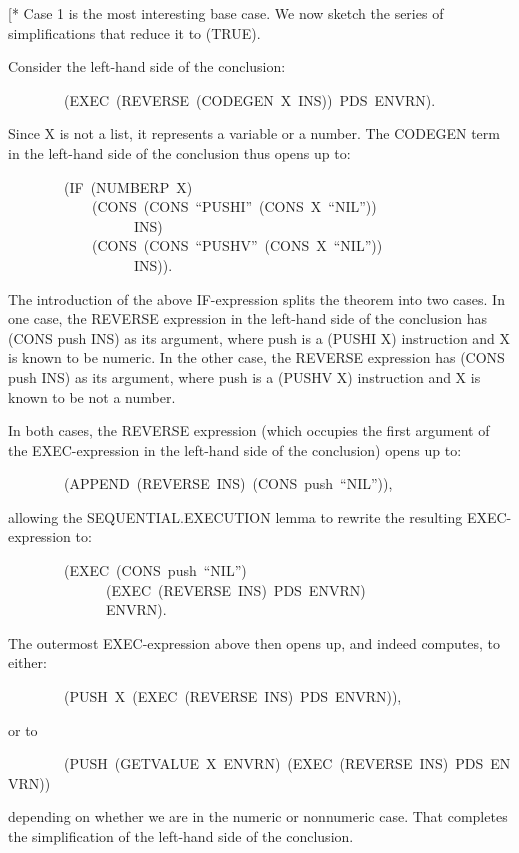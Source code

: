 \documentclass[11pt]{book}
\newenvironment{pubasis}{\begin{flushleft}\ttfamily\small}{\normalsize\rmfamily\end{flushleft}}
\begin{document}
[* Case 1 is the most interesting base case.  We  now sketch the
series of simplifications that reduce it to (TRUE).

Consider the left-hand side of the conclusion:
\begin{pubasis}
~~~~~~~~(EXEC~(REVERSE~(CODEGEN~X~INS))~PDS~ENVRN).\\
\end{pubasis}
Since X is not a list, it represents
a variable or a number.  The CODEGEN term in the left-hand side of the conclusion
thus opens up to:
\begin{pubasis}
~~~~~~~~(IF~(NUMBERP~X)\\
~~~~~~~~~~~~(CONS~(CONS~``PUSHI''~(CONS~X~``NIL''))\\
~~~~~~~~~~~~~~~~~~INS)\\
~~~~~~~~~~~~(CONS~(CONS~``PUSHV''~(CONS~X~``NIL''))\\
~~~~~~~~~~~~~~~~~~INS)).\\
\end{pubasis}
The introduction of the above IF-expression  splits the theorem into two cases.  In one case, the REVERSE
expression in the left-hand side of the conclusion
has (CONS push INS) as its argument, where push is a
(PUSHI X) instruction and X is known to be numeric.  In the other case,
the REVERSE expression has (CONS push INS) as its argument, where push
is a (PUSHV X) instruction and X is known to be not a number.

In both cases, the REVERSE expression (which occupies the first argument of the EXEC-expression
in the left-hand side of the conclusion) opens up
to:
\begin{pubasis}
~~~~~~~~(APPEND~(REVERSE~INS)~(CONS~push~``NIL'')),\\
\end{pubasis}
allowing the
SEQUENTIAL.EXECUTION lemma to rewrite the resulting EXEC-expression to:
\begin{pubasis}
~~~~~~~~(EXEC~(CONS~push~``NIL'')\\
~~~~~~~~~~~~~~(EXEC~(REVERSE~INS)~PDS~ENVRN)\\
~~~~~~~~~~~~~~ENVRN).\\
\end{pubasis}
The outermost EXEC-expression above then opens up, and indeed computes, to
either:
\begin{pubasis}
~~~~~~~~(PUSH~X~(EXEC~(REVERSE~INS)~PDS~ENVRN)),\\
\end{pubasis}
or to
\begin{pubasis}
~~~~~~~~(PUSH~(GETVALUE~X~ENVRN)~(EXEC~(REVERSE~INS)~PDS~ENVRN))\\
\end{pubasis}
depending on whether we are in the numeric or nonnumeric case.
That completes the simplification of the left-hand side of the conclusion.
\end{document}

